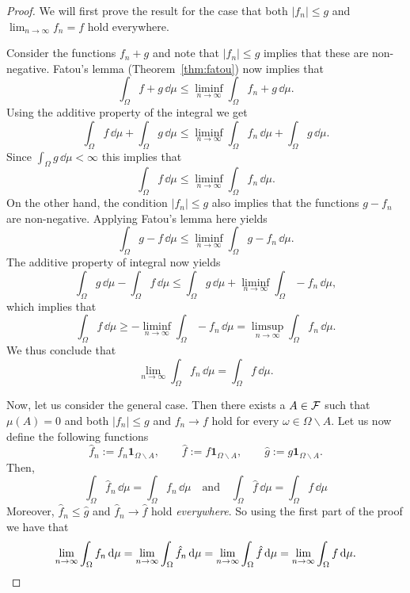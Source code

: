 \begin{proof}
We will first prove the result for the case that both $|f_n| \le g$ and $\lim_{n\to\infty} f_n =f$ hold everywhere.  

Consider the functions $f_n+g$ and note that $|f_n| \le g$ implies that these are non-negative. Fatou's lemma (Theorem~\ref{thm:fatou}) now implies that
\[
	\int_\Omega f + g \, \dd \mu \le \liminf_{n \to \infty} \int_\Omega f_n + g \, \dd \mu.
\] 
Using the additive property of the integral we get
\[
	\int_\Omega f \, \dd \mu + \int_\Omega g \, \dd \mu 
	\le \liminf_{n \to \infty} \int_\Omega f_n \, \dd \mu + \int_\Omega g \, \dd \mu.
\]
Since $\int_\Omega g \, \dd \mu < \infty$ this implies that
\[
	\int_\Omega f \, \dd \mu \le \liminf_{n \to \infty} \int_\Omega f_n \, \dd \mu.
\]
On the other hand, the condition $|f_n| \le g$ also implies that the functions $g - f_n$ are non-negative. Applying Fatou's lemma here yields
\[
	\int_\Omega g - f \, \dd \mu \le \liminf_{n \to \infty} \int_\Omega g - f_n \, \dd \mu.
\]
The additive property of integral now yields
\[
	\int_\Omega g\,\dd \mu - \int_\Omega f \, \dd \mu \le \int_\Omega g \, \dd \mu 
	+ \liminf_{n \to \infty} \int_\Omega - f_n \, \dd \mu,
\]
which implies that 
\[
	\int_\Omega f \, \dd \mu \ge - \liminf_{n \to \infty} \int_\Omega - f_n \, \dd \mu 
	= \limsup_{n \to \infty} \int_\Omega f_n \, \dd \mu.
\]
We thus conclude that
\[
	\lim_{n \to \infty} \int_\Omega f_n \, \dd \mu = \int_\Omega f \, \dd \mu.
\]

Now, let us consider the general case. Then there exists a $A \in \mathcal F$ such that $\mu(A) = 0$ and both $|f_n| \le g$ and $f_n \to f$ hold for every $\omega \in \Omega \backslash A$. Let us now define the following functions
\[
	\hat{f}_n := f_n \mathbf{1}_{\Omega\backslash A},\qquad
	\hat{f} := f \mathbf{1}_{\Omega\backslash A},\qquad \hat{g} := g \mathbf{1}_{\Omega\backslash A}.
\]
Then,
\[
	\int_\Omega \hat{f}_n \, \dd \mu = \int_\Omega f_n \, \dd \mu \quad \text{and} \quad
	\int_\Omega \hat{f} \, \dd \mu = \int_\Omega f \, \dd \mu
\]
Moreover, $\hat{f}_n \le \hat{g}$ and $\hat{f}_n \to \hat{f}$ hold \emph{everywhere}. So using the first part of the proof we have that
\[
	\lim_{n \to \infty} \int_\Omega f_n \, \mathrm{d} \mu = \lim_{n \to \infty} \int_\Omega \hat{f}_n \, \mathrm{d} \mu
	= \lim_{n \to \infty} \int_\Omega \hat{f} \, \mathrm{d} \mu = \lim_{n \to \infty} \int_\Omega f \, \mathrm{d} \mu.\qedhere
\]
\end{proof}

